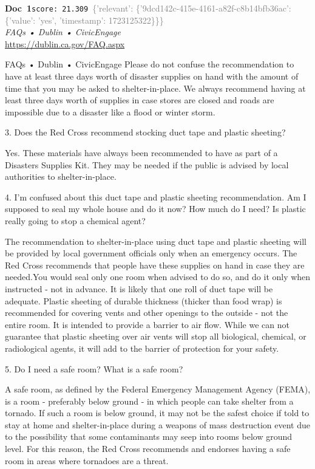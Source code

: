 \documentclass[a4paper,11pt]{article}
\begin{document}
\begin{docenv}
{\footnotesize\textcolor{doccolor}{\textbf{Doc~1}}}\hfill{\tiny\texttt{score:~21.309}}\ {\tiny\textcolor{gray}{\{'relevant': \{'9dcd142c-415e-4161-a82f-c8b14bfb36ac': \{'value': 'yes', 'timestamp': 1723125322\}\}\}}}\\[3pt]
{\small\textit{FAQs • Dublin • CivicEngage}}\\[2pt]
{\tiny\url{https://dublin.ca.gov/FAQ.aspx}}\\[4pt]
{\footnotesize FAQs • Dublin • CivicEngage
Please do not confuse the recommendation to have at least three days worth of disaster supplies on hand with the amount of time that you may be asked to shelter-in-place. We always recommend having at least three days worth of supplies in case stores are closed and roads are impossible due to a disaster like a flood or winter storm. 	

3.
Does the Red Cross recommend stocking duct tape and plastic sheeting?

Yes. These materials have always been recommended to have as part of a Disasters Supplies Kit. They may be needed if the public is advised by local authorities to shelter-in-place.	

4.
I'm confused about this duct tape and plastic sheeting recommendation. Am I supposed to seal my whole house and do it now? How much do I need? Is plastic really going to stop a chemical agent?

The recommendation to shelter-in-place using duct tape and plastic sheeting will be provided by local government officials only when an emergency occurs. The Red Cross recommends that people have these supplies on hand in case they are needed.You would seal only one room when advised to do so, and do it only when instructed - not in advance. It is likely that one roll of duct tape will be adequate. Plastic sheeting of durable thickness (thicker than food wrap) is recommended for covering vents and other openings to the outside - not the entire room. It is intended to provide a barrier to air flow. While we can not guarantee that plastic sheeting over air vents will stop all biological, chemical, or radiological agents, it will add to the barrier of protection for your safety.	

5.
Do I need a safe room? What is a safe room?

A safe room, as defined by the Federal Emergency Management Agency (FEMA), is a room - preferably below ground - in which people can take shelter from a tornado. If such a room is below ground, it may not be the safest choice if told to stay at home and shelter-in-place during a weapons of mass destruction event due to the possibility that some contaminants may seep into rooms below ground level. For this reason, the Red Cross recommends and endorses having a safe room in areas where tornadoes are a threat.}
\end{docenv}
\end{document}
